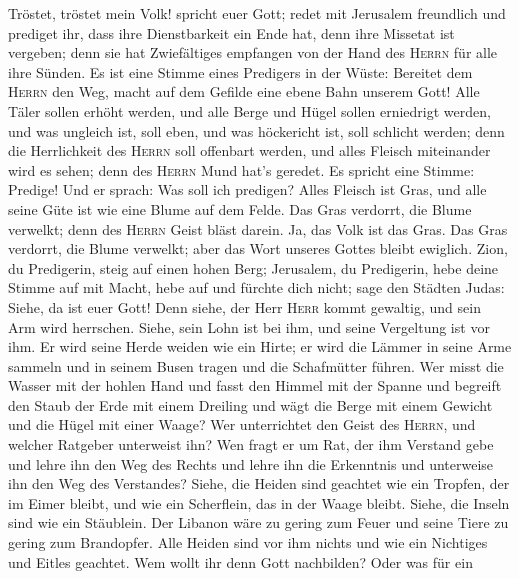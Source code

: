  Tröstet, tröstet mein Volk! spricht euer Gott;
 redet mit Jerusalem freundlich und prediget ihr, dass
ihre Dienstbarkeit ein Ende hat, denn ihre Missetat ist vergeben; denn
sie hat Zwiefältiges empfangen von der Hand des \textsc{Herrn} für alle
ihre Sünden.  Es ist eine Stimme eines Predigers in der
Wüste: Bereitet dem \textsc{Herrn} den Weg, macht auf dem Gefilde eine
ebene Bahn unserem Gott!  Alle Täler sollen erhöht werden,
und alle Berge und Hügel sollen erniedrigt werden, und was ungleich ist,
soll eben, und was höckericht ist, soll schlicht werden; 
denn die Herrlichkeit des \textsc{Herrn} soll offenbart werden, und
alles Fleisch miteinander wird es sehen; denn des \textsc{Herrn} Mund
hat's geredet.  Es spricht eine Stimme: Predige! Und er
sprach: Was soll ich predigen? Alles Fleisch ist Gras, und alle seine
Güte ist wie eine Blume auf dem Felde.  Das Gras verdorrt,
die Blume verwelkt; denn des \textsc{Herrn} Geist bläst darein. Ja, das
Volk ist das Gras.  Das Gras verdorrt, die Blume verwelkt;
aber das Wort unseres Gottes bleibt ewiglich.  Zion, du
Predigerin, steig auf einen hohen Berg; Jerusalem, du Predigerin, hebe
deine Stimme auf mit Macht, hebe auf und fürchte dich nicht; sage den
Städten Judas: Siehe, da ist euer Gott!  Denn siehe, der
Herr \textsc{Herr} kommt gewaltig, und sein Arm wird herrschen. Siehe,
sein Lohn ist bei ihm, und seine Vergeltung ist vor ihm. 
Er wird seine Herde weiden wie ein Hirte; er wird die Lämmer in seine
Arme sammeln und in seinem Busen tragen und die Schafmütter führen.
 Wer misst die Wasser mit der hohlen Hand und fasst den
Himmel mit der Spanne und begreift den Staub der Erde mit einem Dreiling
und wägt die Berge mit einem Gewicht und die Hügel mit einer Waage?
 Wer unterrichtet den Geist des \textsc{Herrn}, und
welcher Ratgeber unterweist ihn?  Wen fragt er um Rat,
der ihm Verstand gebe und lehre ihn den Weg des Rechts und lehre ihn die
Erkenntnis und unterweise ihn den Weg des Verstandes? 
Siehe, die Heiden sind geachtet wie ein Tropfen, der im Eimer bleibt,
und wie ein Scherflein, das in der Waage bleibt. Siehe, die Inseln sind
wie ein Stäublein.  Der Libanon wäre zu gering zum Feuer
und seine Tiere zu gering zum Brandopfer.  Alle Heiden
sind vor ihm nichts und wie ein Nichtiges und Eitles geachtet.
 Wem wollt ihr denn Gott nachbilden? Oder was für ein
